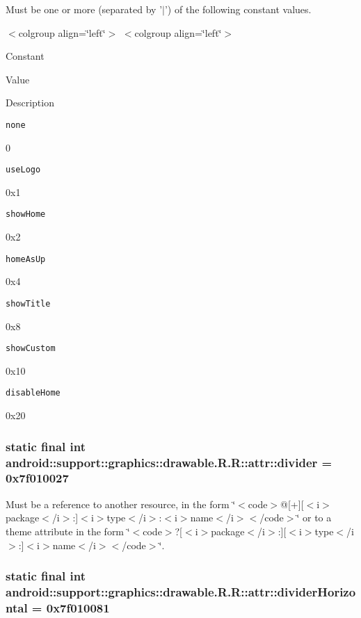 Must be one or more (separated by '$|$') of the following constant values. \begin{TabularC}{0}
\hline
\end{TabularC}
$<$colgroup align=\char`\"{}left\char`\"{}$>$ $<$colgroup align=\char`\"{}left\char`\"{}$>$ 

Constant

Value

Description 

{\tt none}

0

{\tt useLogo}

0x1

{\tt showHome}

0x2

{\tt homeAsUp}

0x4

{\tt showTitle}

0x8

{\tt showCustom}

0x10

{\tt disableHome}

0x20\hypertarget{classandroid_1_1support_1_1graphics_1_1drawable_1_1_r_1_1attr_44eb4c4af915732591b6a6c62dae8cbe}{
\subsubsection[{divider}]{\setlength{\rightskip}{0pt plus 5cm}static final int android::support::graphics::drawable.R.R::attr::divider = 0x7f010027}}
\label{classandroid_1_1support_1_1graphics_1_1drawable_1_1_r_1_1attr_44eb4c4af915732591b6a6c62dae8cbe}


Must be a reference to another resource, in the form \char`\"{}$<$code$>$@\mbox{[}+\mbox{]}\mbox{[}$<$i$>$package$<$/i$>$:\mbox{]}$<$i$>$type$<$/i$>$:$<$i$>$name$<$/i$>$$<$/code$>$\char`\"{} or to a theme attribute in the form \char`\"{}$<$code$>$?\mbox{[}$<$i$>$package$<$/i$>$:\mbox{]}\mbox{[}$<$i$>$type$<$/i$>$:\mbox{]}$<$i$>$name$<$/i$>$$<$/code$>$\char`\"{}. \hypertarget{classandroid_1_1support_1_1graphics_1_1drawable_1_1_r_1_1attr_e816e756073f977d79f5af5d97d1d081}{
\subsubsection[{dividerHorizontal}]{\setlength{\rightskip}{0pt plus 5cm}static final int android::support::graphics::drawable.R.R::attr::dividerHorizontal = 0x7f010081}}
\label{classandroid_1_1support_1_1graphics_1_1drawable_1_1_r_1_1attr_e816e756073f977d79f5af5d97d1d081}



